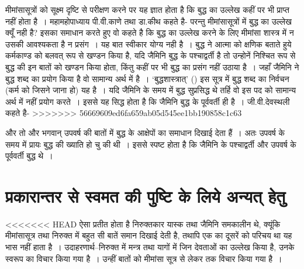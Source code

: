 मीमांसासूत्रों को सूक्ष्म दृष्टि से परीक्षण करने पर यह ज्ञात होता है कि बुद्ध का उल्लेख कहीं पर भी प्राप्त नहीं होता है~। महामहोपाध्याय पी.वी.काणे  तथा डा.कीथ कहते है-  परन्तु मीमांसासूत्रों में बुद्ध का उल्लेख क्यूँ नही है? इसका समाधान करते हुए वो कहते है कि बुद्ध का उल्लेख करने के लिए मीमांसा शास्त्र में न उसकी आवश्यकता है न प्रसंग~। यह बात स्वीकार योग्य नही है~। बुद्ध ने आत्मा को क्षणिक बताते हुये कर्मकाण्ड को बलवत् रूप से खण्डन किया है, यदि जैमिनि बुद्ध के पश्चाद्वर्ती है तो उन्होनें निश्चित रूप से बुद्ध की इन बातों को खण्डन किया होता, किंतु कहीं पर भी बुद्ध का प्रसंग नहीं उठाया है~। जहाँ जैमिनि ने बुद्ध शब्द का प्रयोग किया है वो सामान्य अर्थ में है~। ‘बुद्धशास्त्रात्' () इस सूत्र में बुद्ध शब्द का निर्वचन (कर्म को जिसने जाना हो) यह है~। यदि जैमिनि के समय में बुद्ध सुप्रसिद्ध थे तर्हि वो इस पद को सामान्य अर्थ में नहीं प्रयोग करते~। इससे यह सिद्ध होता है कि जैमिनि बुद्ध के पूर्ववर्ती ही है~। जी.वी.देवस्थली कहते है- 
>>>>>>> 56669609ed6fa659ab05d545ee1bb190858c1c63

और तो और भगवान् उपवर्ष की बातों में बुद्ध के आक्षेपों का समाधान दिखाई देता हैं~। अतः उपवर्ष के समय में प्रायः बुद्ध की ख्याति हो चु की थी~। इससे स्पष्ट होता है कि जैमिनि के पश्चाद्वर्ती और उपवर्ष के पूर्ववर्ती बुद्ध थे~।


\vskip -20pt

\section*{प्रकारान्तर से स्वमत की पुष्टि के लिये अन्यत् हेतु}

\vskip -6pt

<<<<<<< HEAD
ऐसा प्रतीत होता है निरुक्तकार यास्क तथा जैमिनि समकालीन थे, क्यूंकि मीमांसासूत्र तथा निरुक्त में बहुत सी बातें समान दिखाई देती है, तथापि एक का दूसरें को परिचय था यह भास नहीं हाता है~। उदाहरणार्थ–निरुक्त  में मन्त्र तथा यागों में जिन देवताओं का उल्लेख किया है, उनके स्वरूप का विचार किया गया है~। उन्हीं बातों को मीमांसा सूत्र  से लेकर  तक विचार किया गया है~। 

